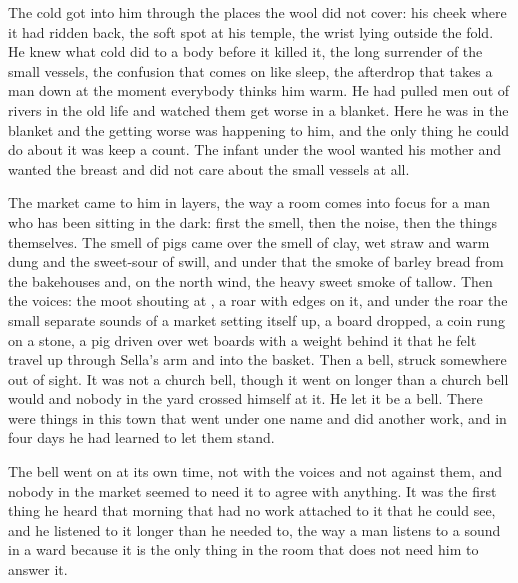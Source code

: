 The cold got into him through the places the wool did not cover: his cheek where it had ridden back, the soft spot at his temple, the wrist lying outside the fold. He knew what cold did to a body before it killed it, the long surrender of the small vessels, the confusion that comes on like sleep, the afterdrop that takes a man down at the moment everybody thinks him warm. He had pulled men out of rivers in the old life and watched them get worse in a blanket. Here he was in the blanket and the getting worse was happening to him, and the only thing he could do about it was keep a count. The infant under the wool wanted his mother and wanted the breast and did not care about the small vessels at all.

The market came to him in layers, the way a room comes into focus for a man who has been sitting in the dark: first the smell, then the noise, then the things themselves. The smell of pigs came over the smell of clay, wet straw and warm dung and the sweet-sour of swill, and under that the smoke of barley bread from the bakehouses and, on the north wind, the heavy sweet smoke of tallow. Then the voices: the moot shouting at , a roar with edges on it, and under the roar the small separate sounds of a market setting itself up, a board dropped, a coin rung on a stone, a pig driven over wet boards with a weight behind it that he felt travel up through Sella's arm and into the basket. Then a bell, struck somewhere out of sight. It was not a church bell, though it went on longer than a church bell would and nobody in the yard crossed himself at it. He let it be a bell. There were things in this town that went under one name and did another work, and in four days he had learned to let them stand.

The bell went on at its own time, not with the voices and not against them, and nobody in the market seemed to need it to agree with anything. It was the first thing he heard that morning that had no work attached to it that he could see, and he listened to it longer than he needed to, the way a man listens to a sound in a ward because it is the only thing in the room that does not need him to answer it.

